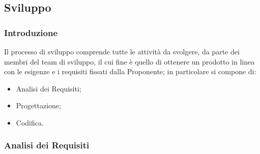 \subsection{Sviluppo}

\subsubsection{Introduzione}
Il processo di sviluppo comprende tutte le attività da svolgere, da parte dei membri del team di sviluppo, il cui fine è quello di ottenere un prodotto in linea con le esigenze e i requisiti fissati dalla Proponente; in particolare si compone di:
\begin{itemize}
    \item Analisi dei Requisiti;
    \item Progettazione;
    \item Codifica.
\end{itemize} 

\subsubsection{Analisi dei Requisiti} \label{sec:analisi-rischi}

